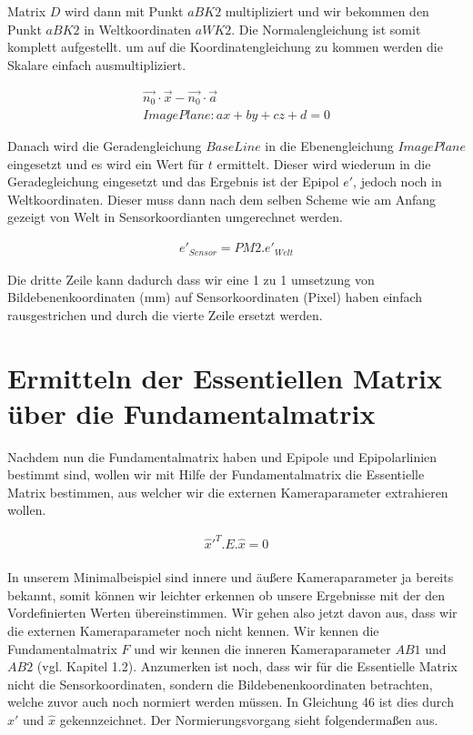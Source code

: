 Matrix \ensuremath{D} wird dann mit Punkt \ensuremath{aBK2} multipliziert und wir bekommen den Punkt \ensuremath{aBK2} in Weltkoordinaten \ensuremath{aWK2}. Die Normalengleichung ist somit komplett aufgestellt. um auf die Koordinatengleichung zu kommen werden die Skalare einfach ausmultipliziert. 

\begin{gather}
\vec{n_0}\cdot \vec{x} - \vec{n_0}\cdot \vec{a}\\
ImagePlane:ax+by+cz+d = 0
\end{gather}

Danach wird die Geradengleichung \ensuremath{BaseLine} in die Ebenengleichung \ensuremath{ImagePlane} eingesetzt und es wird ein Wert für \ensuremath{t} ermittelt. Dieser wird wiederum in die Geradegleichung eingesetzt und das Ergebnis ist der Epipol \ensuremath{e'}, jedoch noch in Weltkoordinaten. Dieser muss dann nach dem selben Scheme wie am Anfang gezeigt von Welt in Sensorkoordianten umgerechnet werden. 

\begin{gather}
e'_{Sensor}=PM2.e'_{Welt}
\end{gather}

Die dritte Zeile kann dadurch dass wir eine 1 zu 1 umsetzung von Bildebenenkoordinaten (mm) auf Sensorkoordinaten (Pixel) haben einfach rausgestrichen und durch die vierte Zeile ersetzt werden.


\section{Ermitteln der Essentiellen Matrix über die Fundamentalmatrix}
	Nachdem nun die Fundamentalmatrix haben und Epipole und Epipolarlinien bestimmt sind, wollen wir mit Hilfe der Fundamentalmatrix die Essentielle Matrix bestimmen, aus welcher wir die externen Kameraparameter extrahieren wollen.

\begin{gather}
\hat{x}'^T.E.\hat{x} = 0
\end{gather}\\ 

In unserem Minimalbeispiel sind innere und äußere Kameraparameter ja bereits bekannt, somit können wir leichter erkennen ob unsere Ergebnisse mit der den Vordefinierten Werten übereinstimmen. Wir gehen also jetzt davon aus, dass wir die externen Kameraparameter noch nicht kennen. Wir kennen die Fundamentalmatrix \ensuremath{F} und wir kennen die inneren Kameraparameter \ensuremath{AB1} und \ensuremath{AB2} (vgl. Kapitel 1.2).
Anzumerken ist noch, dass wir für die Essentielle Matrix nicht die Sensorkoordinaten, sondern die Bildebenenkoordinaten betrachten, welche zuvor auch noch normiert werden müssen. In Gleichung 46 ist dies durch \ensuremath{\hat{x}'} und \ensuremath{\hat{x}} gekennzeichnet. Der Normierungsvorgang sieht folgendermaßen aus.	

